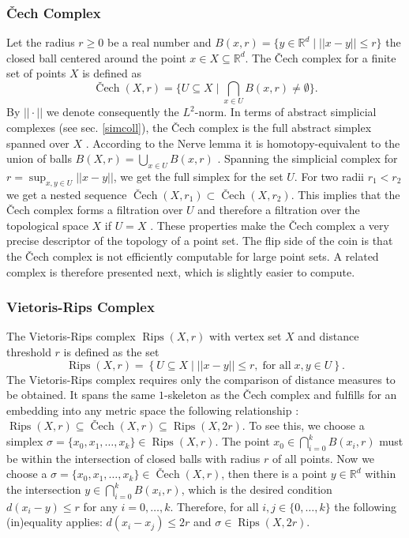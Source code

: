 \documentclass[runningheads]{llncs}
\DeclareMathOperator{\Cech}{\text{\v{C}ech}}
\DeclareMathOperator{\Rips}{\text{Rips}}
\begin{document}
\subsubsection{\v{C}ech Complex \cite{bauer2017morse}} Let the radius $r \geq 0$ be a real number and $B(x,r) = \{y \in \mathbb{R}^d \; | \; ||x-y|| \leq r\}$ the closed ball centered around the point $x \in X \subseteq \mathbb{R}^d$. The \v{C}ech complex for a finite set of points $X$ is defined as
\begin{equation}
  \Cech(X,r) = \{ U \subseteq X  \; \rvert \; \bigcap_{x\in U}B(x,r) \neq \emptyset \}.
\end{equation}
By $||\cdot||$ we denote consequently the $L^2$-norm. In terms of abstract simplicial complexes (see sec. \ref{simcoll}), the \v{C}ech complex is the full abstract simplex spanned over $X$ \cite{bauer2017morse}. According to the Nerve lemma it is homotopy-equivalent to the union of balls $B(X,r) = \bigcup_{x \in U} B(x,r)$ \cite{borsuk}. Spanning the simplicial complex for $r = \sup_{x,y \in U} ||x-y||$, we get the full simplex for the set $U$. For two radii $r_1 < r_2$ we get a nested sequence $\Cech(X,r_1) \subset \Cech(X,r_2)$. This implies that the \v{C}ech complex forms a filtration over $U$ and therefore a filtration over the topological space $X$ if $U = X$ \cite{bauer2017morse}. These properties make the \v{C}ech complex a very precise descriptor of the topology of a point set. The flip side of the coin is that the \v{C}ech complex is not efficiently computable for large point sets. A related complex is therefore presented next, which is slightly easier to compute.

\subsubsection{Vietoris-Rips Complex \cite{boissonnat2018geometric}} The Vietoris-Rips complex $\Rips(X,r)$ with vertex set $X$ and distance threshold $r$ is defined as the set
\begin{equation}
	\label{rips}
\Rips(X,r) = \left\{ U \subseteq X \; \bigg\rvert \; ||x-y|| \leq r, \; \text{for all} \; x,y \in U \right\}.
\end{equation}
The Vietoris-Rips complex requires only the comparison of distance measures to be obtained. It spans the same $1$-skeleton as the \v{C}ech complex and fulfills for an embedding into any metric space the following relationship \cite[p.~15]{boissonnat2018geometric}: $\Rips(X,r)\subseteq \Cech(X,r) \subseteq \Rips(X,2r).$ To see this, we choose a simplex $\sigma = \{x_0,x_1,\ldots,x_k\} \in \Rips(X,r)$. The point $x_0 \in \bigcap_{i=0}^{k}B(x_i,r)$ must be within the intersection of closed balls with radius $r$ of all points. Now we choose a $\sigma = \{x_0,x_1,\ldots,x_k\} \in \Cech(X,r)$, then there is a point $y \in \mathbb{R}^d$ within the intersection $y \in \bigcap_{i=0}^{k}B(x_i,r)$, which is the desired condition $d(x_i-y) \leq r$ for any $i = 0,\ldots,k$. Therefore, for all $i,j \in \{0,\ldots,k\}$ the following (in)equality applies: $d(x_i-x_j) \leq 2r$ and $\sigma \in \Rips(X,2r)$.
\end{document}
